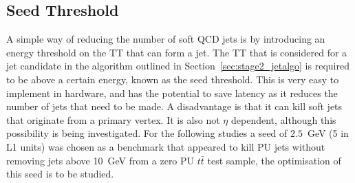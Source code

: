 \subsection{Seed Threshold}
A simple way of reducing the number of soft QCD jets is by introducing an energy threshold on the TT that can form a jet. The TT that is considered for a jet candidate in the algorithm outlined in Section~\ref{sec:stage2_jetalgo} is required to be above a certain energy, known as the seed threshold. This is very easy to implement in hardware, and has the potential to save latency as it reduces the number of jets that need to be made. A disadvantage is that it can kill soft jets that originate from a primary vertex. It is also not $\eta$ dependent, although this possibility is being investigated. For the following studies a seed of $2.5$~GeV (5 in L1 units) was chosen as a benchmark that appeared to kill PU jets without removing jets above 10~GeV from a zero PU $t\bar{t}$ test sample, the optimisation of this seed is to be studied. 


